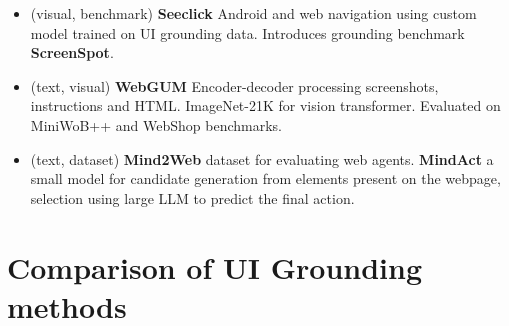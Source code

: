 \begin{itemize}
    \item \textcite{cheng_seeclick_2024} (visual, benchmark) \textbf{Seeclick} Android and web navigation using custom model trained on UI grounding data. Introduces grounding benchmark \textbf{ScreenSpot}.
    \item \textcite{furuta_multimodal_2023} (text, visual) \textbf{WebGUM} Encoder-decoder processing screenshots, instructions and HTML. ImageNet-21K for vision transformer. Evaluated on MiniWoB++ and WebShop benchmarks.
    \item \textcite{deng_mind2web_2023} (text, dataset) \textbf{Mind2Web} dataset for evaluating web agents. \textbf{MindAct} a small model for candidate generation from elements present on the webpage, selection using large LLM to predict the final action.
\end{itemize}

\section{Comparison of UI Grounding methods}

